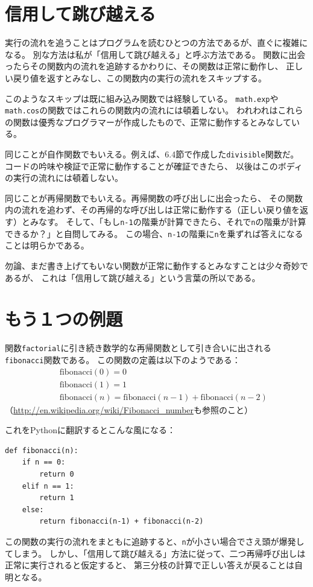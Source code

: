 \documentclass[a4j,12pt,makeidx]{jbook}
\begin{document}
\section{信用して跳び越える}
実行の流れを追うことはプログラムを読むひとつの方法であるが、直ぐに複雑になる。
別な方法は私が「信用して跳び越える」と呼ぶ方法である。
関数に出会ったらその関数内の流れを追跡するかわりに、その関数は正常に動作し、
正しい戻り値を返すとみなし、この関数内の実行の流れをスキップする。\par
このようなスキップは既に組み込み関数では経験している。
{\tt math.exp}や{\tt math.cos}の関数ではこれらの関数内の流れには頓着しない。
われわれはこれらの関数は優秀なプログラマーが作成したもので、正常に動作するとみなしている。\par
同じことが自作関数でもいえる。例えば、6.4節で作成した{\tt divisible}関数だ。
コードの吟味や検証で正常に動作することが確証できたら、
以後はこのボディの実行の流れには頓着しない。 \par
同じことが再帰関数でもいえる。再帰関数の呼び出しに出会ったら、
その関数内の流れを追わず、その再帰的な呼び出しは正常に動作する（正しい戻り値を返す）とみなす。
そして、「もし{\tt n-1}の階乗が計算できたら、それで{\tt n}の階乗が計算できるか？」と自問してみる。
この場合、{\tt n-1}の階乗に{\tt n}を乗ずれば答えになることは明らかである。 \par
勿論、まだ書き上げてもいない関数が正常に動作するとみなすことは少々奇妙であるが、
これは「信用して跳び越える」という言葉の所以である。
%
\section{もう１つの例題}
関数{\tt factorial}に引き続き数学的な再帰関数として引き合いに出される{\tt fibonacci}関数である。
この関数の定義は以下のようである：
\begin{eqnarray*}
&& \mathrm{fibonacci}(0) = 0 \\
&& \mathrm{fibonacci}(1) = 1 \\
&& \mathrm{fibonacci}(n) = \mathrm{fibonacci}(n-1) + \mathrm{fibonacci}(n-2)
\end{eqnarray*}
（\url{http://en.wikipedia.org/wiki/Fibonacci_number}も参照のこと） \par
これをPythonに翻訳するとこんな風になる：
\begin{verbatim}
def fibonacci(n):
    if n == 0:
        return 0
    elif n == 1:
        return 1
    else:
        return fibonacci(n-1) + fibonacci(n-2)
\end{verbatim}
この関数の実行の流れをまともに追跡すると、{\tt n}が小さい場合でさえ頭が爆発してしまう。
しかし、「信用して跳び越える」方法に従って、二つ再帰呼び出しは正常に実行されると仮定すると、
第三分枝の計算で正しい答えが戻ることは自明となる。
%
\end{document}
